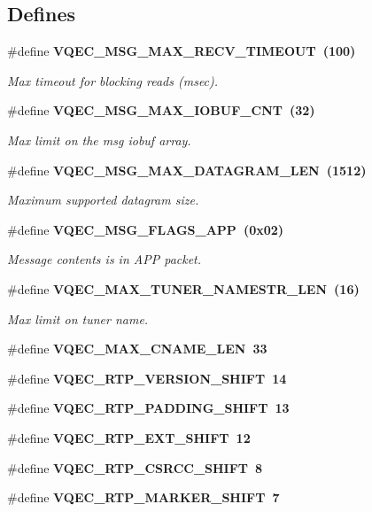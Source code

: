\subsection*{Defines}
\begin{CompactItemize}
\item 
\#define \bf{VQEC\_\-MSG\_\-MAX\_\-RECV\_\-TIMEOUT}~(100)
\begin{CompactList}\small\item\em Max timeout for blocking reads (msec). \item\end{CompactList}\item 
\#define \bf{VQEC\_\-MSG\_\-MAX\_\-IOBUF\_\-CNT}~(32)
\begin{CompactList}\small\item\em Max limit on the msg iobuf array. \item\end{CompactList}\item 
\#define \bf{VQEC\_\-MSG\_\-MAX\_\-DATAGRAM\_\-LEN}~(1512)
\begin{CompactList}\small\item\em Maximum supported datagram size. \item\end{CompactList}\item 
\#define \bf{VQEC\_\-MSG\_\-FLAGS\_\-APP}~(0x02)
\begin{CompactList}\small\item\em Message contents is in APP packet. \item\end{CompactList}\item 
\#define \bf{VQEC\_\-MAX\_\-TUNER\_\-NAMESTR\_\-LEN}~(16)
\begin{CompactList}\small\item\em Max limit on tuner name. \item\end{CompactList}\item 
\#define \bf{VQEC\_\-MAX\_\-CNAME\_\-LEN}~33
\item 
\#define \bf{VQEC\_\-RTP\_\-VERSION\_\-SHIFT}~14
\item 
\#define \bf{VQEC\_\-RTP\_\-PADDING\_\-SHIFT}~13
\item 
\#define \bf{VQEC\_\-RTP\_\-EXT\_\-SHIFT}~12
\item 
\#define \bf{VQEC\_\-RTP\_\-CSRCC\_\-SHIFT}~8
\item 
\#define \bf{VQEC\_\-RTP\_\-MARKER\_\-SHIFT}~7
\item 

\end{CompactItemize}
